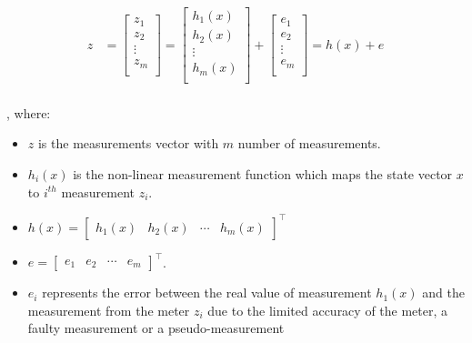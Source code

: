     \begin{align} 
        z &=  \begin{bmatrix}
                    z_{1} \\
                    z_{2} \\
                    \vdots \\
                    z_{m} \\
              \end{bmatrix}
          = \begin{bmatrix}
                    h_1(x) \\
                    h_2(x) \\
                    \vdots \\
                    h_m(x) \\
              \end{bmatrix} +
            \begin{bmatrix}
                    e_1 \\
                    e_2 \\
                    \vdots \\
                    e_m \\
              \end{bmatrix}  
          = h(x)+e
        \label{eq:meas_fun}
    \end{align}
\\, where:    
\begin{itemize}
    \item $z$ is the measurements vector with $m$ number of measurements.
    \item $h_i(x)$ is the non-linear measurement function which maps the state vector $x$ to $i^{th}$ measurement $z_i$. 
    \item $h(x)=\begin{bmatrix}
                    h_{1}(x) &
                    h_{2}(x) &
                    \cdots &
                    h_{m}(x) 
              \end{bmatrix}^\intercal$ 
    \item $e=\begin{bmatrix}
                e_{1} &
                e_{2} &
                \cdots &
                e_{m} 
          \end{bmatrix}^\intercal$.          
    \item $e_{i}$ represents the error between the real value of measurement $h_{1}(x)$ and the measurement from the meter $z_i$ due to the limited accuracy of the meter, a faulty measurement or a pseudo-measurement
    \end{itemize}
